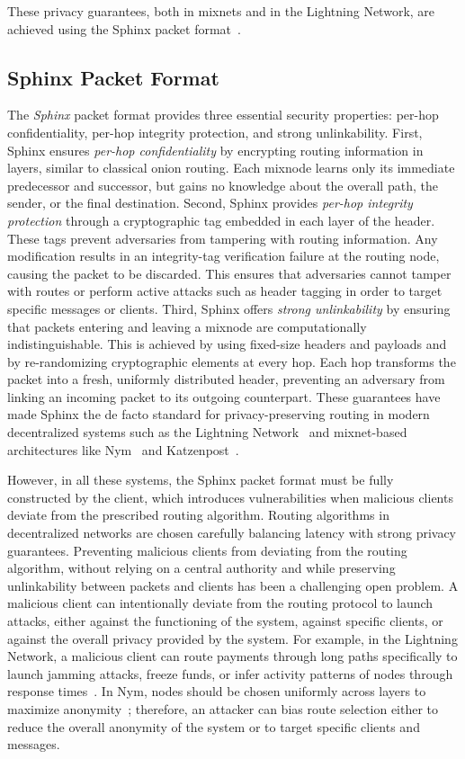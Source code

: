 These privacy guarantees, both in mixnets and in the Lightning Network, are achieved using the Sphinx packet format~\cite{sphinx}.


\subsection{Sphinx Packet Format}
The \emph{Sphinx} packet format provides three essential security properties: per-hop confidentiality, per-hop integrity protection, and strong unlinkability.
First, Sphinx ensures \emph{per-hop confidentiality} by encrypting routing information in layers, similar to classical onion routing.  
Each mixnode learns only its immediate predecessor and successor, but gains no knowledge about the overall path, the sender, or the final destination. Second, Sphinx provides \emph{per-hop integrity protection} through a cryptographic tag embedded in each layer of the header. These tags prevent adversaries from tampering with routing information.  Any modification results in an integrity-tag verification failure at the routing node, causing the packet to be discarded.
This ensures that adversaries cannot tamper with routes or perform active attacks such as header tagging in order to target specific messages or clients. Third, Sphinx offers \emph{strong unlinkability} by ensuring that packets entering and leaving a mixnode are computationally indistinguishable.  
This is achieved by using fixed-size headers and payloads and by re-randomizing cryptographic elements at every hop.
Each hop transforms the packet into a fresh, uniformly distributed header, preventing an adversary from linking an incoming packet to its outgoing counterpart. These guarantees have made Sphinx the de facto standard for privacy-preserving routing in modern decentralized systems such as the Lightning Network~\cite{poon2016bitcoin} and mixnet-based architectures like Nym~\cite{nym} and Katzenpost~\cite{infeld2025echomix}.

However, in all these systems, the Sphinx packet format must be fully constructed by the client, which introduces vulnerabilities when malicious clients deviate from the prescribed routing algorithm. 
Routing algorithms in decentralized networks are chosen carefully balancing latency with strong privacy guarantees. Preventing malicious clients from deviating from the routing algorithm, without relying on a central authority and while preserving unlinkability between packets and clients has been a challenging open problem. A malicious client can intentionally deviate from the routing protocol to launch attacks, either against the functioning of the system, against specific clients, or against the overall privacy provided by the system. For example, in the Lightning Network, a malicious client can route payments through long paths specifically to launch jamming attacks, freeze funds, or infer activity patterns of nodes through response times~\cite{Rohrer2019paymentchannels,kappos2021empirical}. In Nym, nodes should be chosen uniformly across layers to maximize anonymity~\cite{benguirat2022mixnet}; therefore, an attacker can bias route selection either to reduce the overall anonymity of the system or to target specific clients and messages.
